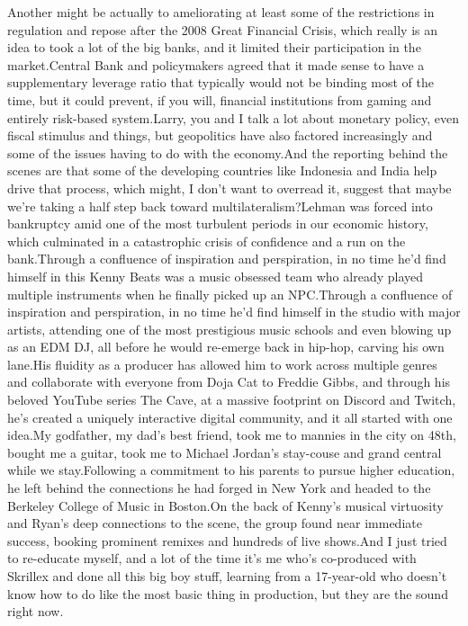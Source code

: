 \documentclass{article}%
\begin{document}
Another might be actually to ameliorating at least some of the restrictions in regulation and repose after the 2008 Great Financial Crisis, which really is an idea to took a lot of the big banks, and it limited their participation in the market.Central Bank and policymakers agreed that it made sense to have a supplementary leverage ratio that typically would not be binding most of the time, but it could prevent, if you will, financial institutions from gaming and entirely risk{-}based system.Larry, you and I talk a lot about monetary policy, even fiscal stimulus and things, but geopolitics have also factored increasingly and some of the issues having to do with the economy.And the reporting behind the scenes are that some of the developing countries like Indonesia and India help drive that process, which might, I don't want to overread it, suggest that maybe we're taking a half step back toward multilateralism?Lehman was forced into bankruptcy amid one of the most turbulent periods in our economic history, which culminated in a catastrophic crisis of confidence and a run on the bank.Through a confluence of inspiration and perspiration, in no time he'd find himself in this  Kenny Beats was a music obsessed team who already played multiple instruments when he finally picked up an NPC.Through a confluence of inspiration and perspiration, in no time he'd find himself in the studio with major artists, attending one of the most prestigious music schools and even blowing up as an EDM DJ, all before he would re{-}emerge back in hip{-}hop, carving his own lane.His fluidity as a producer has allowed him to work across multiple genres and collaborate with everyone from Doja Cat to Freddie Gibbs, and through his beloved YouTube series The Cave, at a massive footprint on Discord and Twitch, he's created a uniquely interactive digital community, and it all started with one idea.My godfather, my dad's best friend, took me to mannies in the city on 48th, bought me a guitar, took me to Michael Jordan's stay{-}couse and grand central while we stay.Following a commitment to his parents to pursue higher education, he left behind the connections he had forged in New York and headed to the Berkeley College of Music in Boston.On the back of Kenny's musical virtuosity and Ryan's deep connections to the scene, the group found near immediate success, booking prominent remixes and hundreds of live shows.And I just tried to re{-}educate myself, and a lot of the time it's me who's co{-}produced with Skrillex and done all this big boy stuff, learning from a 17{-}year{-}old who doesn't know how to do like the most basic thing in production, but they are the sound right now.%
\end{document}

